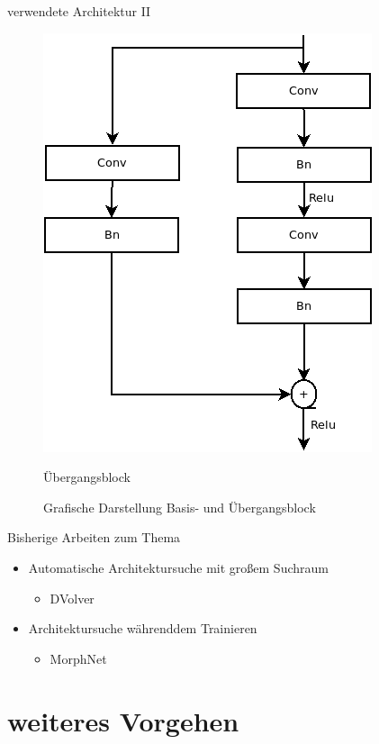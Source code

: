 \documentclass[10pt]{beamer}
\begin{document}
\begin{frame}{verwendete Architektur II}
\begin{figure}[]
\begin{minipage}[b]{.4\linewidth}
      \includegraphics[width=0.8\linewidth]{images/Ubergangsblock.png}
      \caption{Übergangsblock}
   \end{minipage}
   \caption{Grafische Darstellung Basis- und Übergangsblock}
\end{figure}
\end{frame}


\begin{frame}{Bisherige Arbeiten zum Thema}
\begin{itemize}
 \item Automatische Architektursuche mit großem Suchraum
 \begin{itemize}
    \item DVolver 
 \end{itemize}
 \item Architektursuche währenddem Trainieren
 \begin{itemize}
    \item MorphNet
 \end{itemize}
\end{itemize}
\end{frame}

\section{weiteres Vorgehen}
\end{document}
